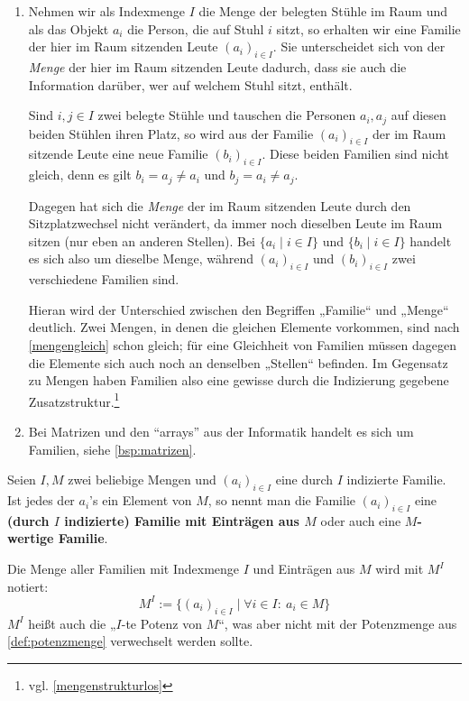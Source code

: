 \begin{bsp} \quad
    \begin{enumerate}
	\item Nehmen wir als Indexmenge $I$ die Menge der belegten Stühle im Raum und als das Objekt $a_i$ die Person, die auf Stuhl $i$ sitzt, so erhalten wir eine Familie der hier im Raum sitzenden Leute $(a_i)_{i\in I}$. Sie unterscheidet sich von der \textit{Menge} der hier im Raum sitzenden Leute dadurch, dass sie auch die Information darüber, wer auf welchem Stuhl sitzt, enthält.
	
	Sind $i,j\in I$ zwei belegte Stühle und tauschen die Personen $a_i,a_j$ auf diesen beiden Stühlen ihren Platz, so wird aus der Familie $(a_i)_{i\in I}$ der im Raum sitzende Leute eine neue Familie $(b_i)_{i\in I}$. Diese beiden Familien sind nicht gleich, denn es gilt $b_i=a_j\neq a_i$ und $b_j=a_i\neq a_j$.
	
	Dagegen hat sich die \emph{Menge} der im Raum sitzenden Leute durch den Sitzplatzwechsel nicht verändert, da immer noch dieselben Leute im Raum sitzen (nur eben an anderen Stellen). Bei $\{a_i\mid i\in I\}$ und $\{b_i \mid i\in I\}$ handelt es sich also um dieselbe Menge, während $(a_i)_{i\in I}$ und $(b_i)_{i\in I}$ zwei verschiedene Familien sind.
	
        Hieran wird der Unterschied zwischen den Begriffen „Familie“ und „Menge“ deutlich. Zwei Mengen, in denen die gleichen Elemente vorkommen, sind nach \cref{mengengleich} schon gleich; für eine Gleichheit von Familien müssen dagegen die Elemente sich auch noch an denselben „Stellen“ befinden. Im Gegensatz zu Mengen haben Familien also eine gewisse durch die Indizierung gegebene Zusatzstruktur.\footnote{vgl. \cref{mengenstrukturlos}}
	\item Bei Matrizen und den ``arrays'' aus der Informatik handelt es sich um Familien, siehe \cref{bsp:matrizen}.
    \end{enumerate}
\end{bsp}


\begin{de} \label{def:mengenpotenz}
    Seien $I,M$ zwei beliebige Mengen und $(a_i)_{i\in I}$ eine durch $I$ indizierte Familie. Ist jedes der $a_i$'s ein Element von $M$, so nennt man die Familie $(a_i)_{i\in I}$ eine \textbf{(durch $I$ indizierte) Familie mit Einträgen aus $M$} oder auch eine \textbf{$M$-wertige Familie}.
    
    Die Menge aller Familien mit Indexmenge $I$ und Einträgen aus $M$ wird mit $M^I$ notiert:
        \[ M^I := \{ (a_i)_{i\in I} \mid \forall i\in I:\ a_i \in M \} \]
    $M^I$ heißt auch die „$I$-te Potenz von $M$“, was aber nicht mit der Potenzmenge aus \cref{def:potenzmenge} verwechselt werden sollte.
\end{de}


